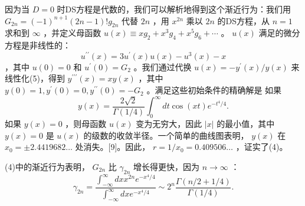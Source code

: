 \documentclass[UTF8]{article}
\begin{document}
因为当   $D=0$   时DS方程是代数的，我们可以解析地得到这个渐近行为：我们用   $G_{2 n}=(-1)^{n+1}(2 n-1) ! g_{2 n}$   代替   $2 n$   ，用   $x^{2 n}$   乘以   $2 n$   的DS方程，从   $n=1$   求和到   $\infty$   ，并定义母函数   $u(x) \equiv x g_2+x^3 g_4+x^5 g_6+\cdots$   。   $u(x)$   满足的微分方程是非线性的：
   $$u^{\prime \prime}(x)=3 u^{\prime}(x) u(x)-u^3(x)-x
$$   ，其中   $u(0)=0$   和   $u^{\prime}(0)=G_2$   。我们通过代换   $u(x)=-y^{\prime}(x) / y(x)$   来线性化(5)，得到   $y^{\prime \prime \prime}(x)=x y(x)$   ，其中   $y(0)=1, y^{\prime}(0)=0, y^{\prime \prime}(0)=-G_2$   。满足这些初始条件的精确解是
如果   $$y(x)=\frac{2 \sqrt{2}}{\Gamma(1 / 4)} \int_0^{\infty} d t \cos (x t) e^{-t^4 / 4} .
$$   如果   $y(x)=0$   ，则母函数   $u(x)$   变为无穷大，因此   $|x|$   的最小值，其中   $y(x)=0$   是   $u(x)$   的级数的收敛半径。一个简单的曲线图表明，   $y(x)$   在   $x_0= \pm 2.4419682 \ldots$   处消失。[9]。因此，   $r=1 / x_0=0.409506 \ldots$   ，证实了(4)。


(4)中的渐近行为表明，   $G_{2 n}$   比   $\gamma_{2 n}$   增长得更快，因为   $n \rightarrow \infty$   ：
   $$
\gamma_{2 n}=\frac{\int_{-\infty}^{\infty} d x x^{2 n} e^{-x^4 / 4}}{\int_{-\infty}^{\infty} d x e^{-x^4 / 4}} \sim 2^n \frac{\Gamma(n / 2+1 / 4)}{\Gamma(1 / 4)} .
$$   
\end{document}
